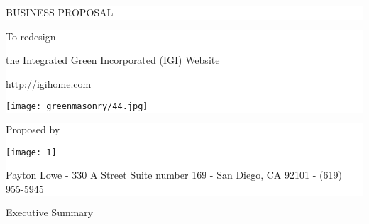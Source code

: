 \documentclass[35pt]{report}
\begin{document}
\large
\begin{titlepage}
\colorbox{white}{
	\parbox[t]{1.0\linewidth}{
       	\begin{center} 
			\fontsize{40pt}{50pt}\selectfont 
			\vspace*{2cm}
				BUSINESS PROPOSAL\par
			\vspace*{2cm}
		\end{center}
	}
}
\colorbox{white}{
	\parbox[t]{1.0\linewidth}{
       	\begin{center} 
			\fontsize{18pt}{15pt}\selectfont 
			\vspace*{.1cm}
				{To redesign \par}
				{the Integrated Green Incorporated (IGI) Website \par}
				{http://igihome.com \par}
				{\texttt{[image: greenmasonry/44.jpg]}\par}
			\vspace*{0.1cm}
		\end{center}
	}
}
\colorbox{white}{
	\parbox[t]{1.0\linewidth}{
       	\begin{center} 
			\fontsize{21pt}{11pt}\selectfont 
			\vspace*{1cm}
				{Proposed by\par}
				\vspace*{.5cm}
				{\texttt{[image: 1]}\par}
				{\fontsize{11pt}{11pt}\selectfont Payton Lowe - 330 A Street Suite number 169 - San Diego, CA 92101 - (619) 955-5945\par}
			\vspace*{0.1cm}
		\end{center}
	}
}


\vfill
\end{titlepage}
\clearpage 

\thispagestyle{empty} 

\begin{center}
	{\fontsize{30pt}{50pt}\selectfont Executive Summary\\}
\end{center}
\end{document}

